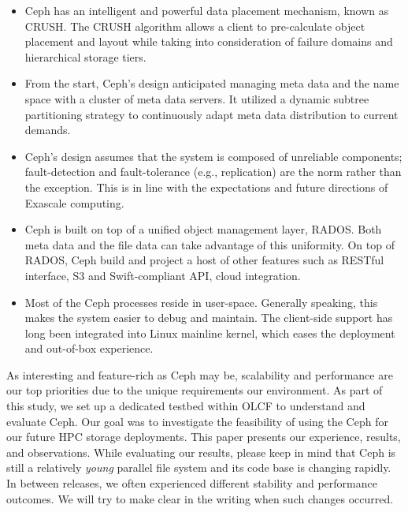 \begin{itemize}
 
\item Ceph has an intelligent and powerful data placement mechanism, known as
  CRUSH. The CRUSH algorithm allows a client to pre-calculate object
  placement and layout while taking into consideration of failure domains and
  hierarchical storage tiers.
  
  \item From the start, Ceph's design anticipated managing meta data and the
  name space with a cluster of meta data servers. It utilized a dynamic subtree
  partitioning strategy to continuously adapt meta data distribution to current
  demands.

  \item Ceph's design assumes that the system is composed of unreliable
  components; fault-detection and fault-tolerance (e.g., replication) are the
  norm rather than the exception. This is in line with the expectations and
  future directions of Exascale computing.

  \item Ceph is built on top of a unified object management layer, RADOS. Both
  meta data and the file data can take advantage of this uniformity. On top of
  RADOS, Ceph build and project a host of other features such as RESTful
  interface, S3 and Swift-compliant API, cloud integration.

  \item Most of the Ceph processes reside in user-space. Generally speaking,
this makes the system easier to debug and maintain. The client-side support has
long been integrated into Linux mainline kernel, which eases the deployment and
out-of-box experience.

\end{itemize}

As interesting and feature-rich as Ceph may be,  scalability and performance
are our top priorities due to the unique requirements our environment.  As part
of this study, we set up a dedicated testbed within OLCF to understand and
evaluate Ceph.  Our goal was to investigate the feasibility of using the Ceph
for our future HPC storage deployments. This paper presents our experience,
results, and observations.  While evaluating our results, please keep in mind
that Ceph is still a relatively \textit{young} parallel file system and its
code base is changing rapidly. In between releases, we often experienced
different stability and performance outcomes.  We will try to make clear in the
writing when such changes occurred.

